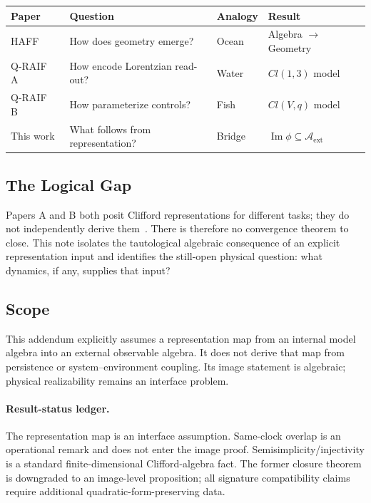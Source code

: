 \documentclass[12pt,a4paper,openany]{book}
\begin{document}
\begin{center}
\small
\begin{tabular}{@{}llll@{}}
\toprule
\textbf{Paper} & \textbf{Question} & \textbf{Analogy} & \textbf{Result} \\
\midrule
HAFF~\cite{Liu2026PaperA} & How does geometry emerge? & Ocean & Algebra $\to$ Geometry \\
Q-RAIF A~\cite{Liu2026QRAIF_A} & How encode Lorentzian read-out? & Water & $Cl(1,3)$ model \\
Q-RAIF B~\cite{Liu2026QRAIF_B} & How parameterize controls? & Fish & $Cl(V,q)$ model \\
This work & What follows from representation? & Bridge & $\operatorname{Im}\phi\subseteq\mathcal A_{\mathrm{ext}}$ \\
\bottomrule
\end{tabular}
\end{center}

\subsection{The Logical Gap}

Papers A and B both posit Clifford representations for different tasks; they do not independently derive them~\cite{Liu2026QRAIF_A,Liu2026QRAIF_B}.  There is therefore no convergence theorem to close.  This note isolates the tautological algebraic consequence of an explicit representation input and identifies the still-open physical question: what dynamics, if any, supplies that input?

\subsection{Scope}

This addendum explicitly assumes a representation map from an internal model algebra into an external observable algebra.  It does not derive that map from persistence or system--environment coupling.  Its image statement is algebraic; physical realizability remains an interface problem.

\paragraph{Result-status ledger.}
The representation map is an interface assumption.  Same-clock overlap is an operational remark and does not enter the image proof.  Semisimplicity/injectivity is a standard finite-dimensional Clifford-algebra fact.  The former closure theorem is downgraded to an image-level proposition; all signature compatibility claims require additional quadratic-form-preserving data.
\end{document}
